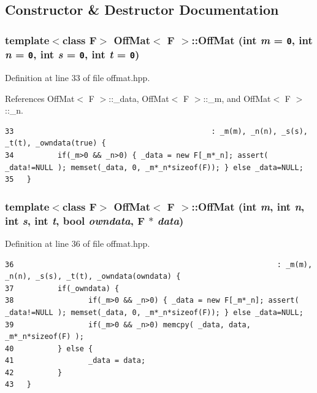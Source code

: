 \subsection{Constructor \& Destructor Documentation}
\subsubsection{\setlength{\rightskip}{0pt plus 5cm}template$<$class F$>$ {\bf Off\-Mat}$<$ F $>$::{\bf Off\-Mat} (int {\em m} = {\tt 0}, int {\em n} = {\tt 0}, int {\em s} = {\tt 0}, int {\em t} = {\tt 0})\hspace{0.3cm}{\tt  [inline]}}\label{classOffMat_63bedae3272fd1e86a28d5e60376f454_63bedae3272fd1e86a28d5e60376f454}




Definition at line 33 of file offmat.hpp.

References Off\-Mat$<$ F $>$::\_\-data, Off\-Mat$<$ F $>$::\_\-m, and Off\-Mat$<$ F $>$::\_\-n.

\footnotesize\begin{verbatim}33                                             : _m(m), _n(n), _s(s), _t(t), _owndata(true) {
34          if(_m>0 && _n>0) { _data = new F[_m*_n]; assert( _data!=NULL ); memset(_data, 0, _m*_n*sizeof(F)); } else _data=NULL;
35   }
\end{verbatim}\normalsize 


\subsubsection{\setlength{\rightskip}{0pt plus 5cm}template$<$class F$>$ {\bf Off\-Mat}$<$ F $>$::{\bf Off\-Mat} (int {\em m}, int {\em n}, int {\em s}, int {\em t}, bool {\em owndata}, F $\ast$ {\em data})\hspace{0.3cm}{\tt  [inline]}}\label{classOffMat_90312012b1c48e498b74c50cc26b3fec_90312012b1c48e498b74c50cc26b3fec}




Definition at line 36 of file offmat.hpp.

\footnotesize\begin{verbatim}36                                                            : _m(m), _n(n), _s(s), _t(t), _owndata(owndata) {
37          if(_owndata) {
38                 if(_m>0 && _n>0) { _data = new F[_m*_n]; assert( _data!=NULL ); memset(_data, 0, _m*_n*sizeof(F)); } else _data=NULL;
39                 if(_m>0 && _n>0) memcpy( _data, data, _m*_n*sizeof(F) );
40          } else {
41                 _data = data;
42          }
43   }
\end{verbatim}\normalsize 



